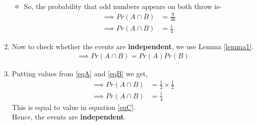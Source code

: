 \documentclass[journal,12pt,twocolumn]{IEEEtran}
\begin{document}
\begin{enumerate}
\begin{itemize}
\begin{multline}
    \end{multline}
    \item So, the probability that odd numbers appears on both throw is-
\begin{align}
\implies  Pr(A\cap B) &= \frac{9}{36} 
\\
\implies  Pr(A\cap B) &= \frac{1}{4} \label{eqC}
 \end{align}
 \end{itemize}
\item Now to check whether the events are \textbf{independent}, we use Lemma \eqref{lemma1}.
\begin{align}
 \implies   Pr(A\cap B) = Pr(A)Pr(B) 
    \end{align}
    \item Putting values from \eqref{eqA} and \eqref{eqB} we get,
    \begin{align}
  \implies  Pr(A\cap B) & = \frac{1}{2}\times\frac{1}{2}
    \\
\implies   Pr(A\cap B)  &= \frac{1}{4}
\end{align}
This is equal to value in equation \eqref{eqC}.
\\
Hence, the events are \textbf{independent}.
\end{enumerate}
\end{document}
